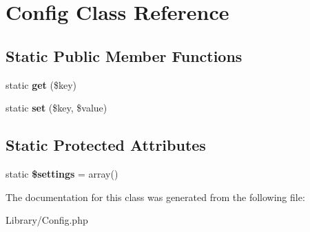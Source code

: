 \hypertarget{class_config}{\section{Config Class Reference}
\label{class_config}
}
\subsection*{Static Public Member Functions}
\begin{DoxyCompactItemize}
\item 
\hypertarget{class_config_a15e2679f2a8f6fa4d60757f4d65413ac}{static {\bfseries get} (\$key)}\label{class_config_a15e2679f2a8f6fa4d60757f4d65413ac}

\item 
\hypertarget{class_config_aa485369b2925858d92e468d405bd0798}{static {\bfseries set} (\$key, \$value)}\label{class_config_aa485369b2925858d92e468d405bd0798}

\end{DoxyCompactItemize}
\subsection*{Static Protected Attributes}
\begin{DoxyCompactItemize}
\item 
\hypertarget{class_config_ac7c3353107070daa85f641882931b358}{static {\bfseries \$settings} = array()}\label{class_config_ac7c3353107070daa85f641882931b358}

\end{DoxyCompactItemize}


The documentation for this class was generated from the following file\-:\begin{DoxyCompactItemize}
\item 
Library/Config.\-php\end{DoxyCompactItemize}
